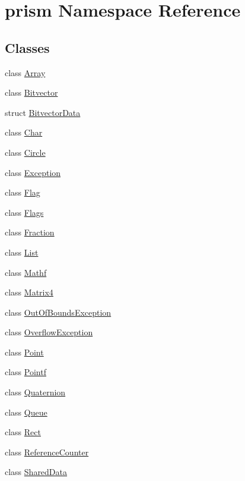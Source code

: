 \hypertarget{namespaceprism}{}\section{prism Namespace Reference}
\label{namespaceprism}
\subsection*{Classes}
\begin{DoxyCompactItemize}
\item 
class \hyperlink{classprism_1_1_array}{Array}
\item 
class \hyperlink{classprism_1_1_bitvector}{Bitvector}
\item 
struct \hyperlink{structprism_1_1_bitvector_data}{Bitvector\+Data}
\item 
class \hyperlink{classprism_1_1_char}{Char}
\item 
class \hyperlink{classprism_1_1_circle}{Circle}
\item 
class \hyperlink{classprism_1_1_exception}{Exception}
\item 
class \hyperlink{classprism_1_1_flag}{Flag}
\item 
class \hyperlink{classprism_1_1_flags}{Flags}
\item 
class \hyperlink{classprism_1_1_fraction}{Fraction}
\item 
class \hyperlink{classprism_1_1_list}{List}
\item 
class \hyperlink{classprism_1_1_mathf}{Mathf}
\item 
class \hyperlink{classprism_1_1_matrix4}{Matrix4}
\item 
class \hyperlink{classprism_1_1_out_of_bounds_exception}{Out\+Of\+Bounds\+Exception}
\item 
class \hyperlink{classprism_1_1_overflow_exception}{Overflow\+Exception}
\item 
class \hyperlink{classprism_1_1_point}{Point}
\item 
class \hyperlink{classprism_1_1_pointf}{Pointf}
\item 
class \hyperlink{classprism_1_1_quaternion}{Quaternion}
\item 
class \hyperlink{classprism_1_1_queue}{Queue}
\item 
class \hyperlink{classprism_1_1_rect}{Rect}
\item 
class \hyperlink{classprism_1_1_reference_counter}{Reference\+Counter}
\item 
class \hyperlink{classprism_1_1_shared_data}{Shared\+Data}

\end{DoxyCompactItemize}

